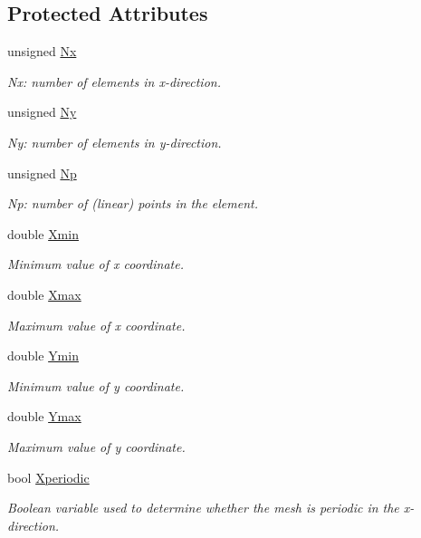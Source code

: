 \subsection*{Protected Attributes}
\begin{DoxyCompactItemize}
\item 
unsigned \hyperlink{classoomph_1_1RectangularQuadMesh_a1b2c0a2d1f8399713033953c72d399ee}{Nx}
\begin{DoxyCompactList}\small\item\em Nx\+: number of elements in x-\/direction. \end{DoxyCompactList}\item 
unsigned \hyperlink{classoomph_1_1RectangularQuadMesh_a49a5ee7ef86ce837fb807eb6014a296d}{Ny}
\begin{DoxyCompactList}\small\item\em Ny\+: number of elements in y-\/direction. \end{DoxyCompactList}\item 
unsigned \hyperlink{classoomph_1_1RectangularQuadMesh_a92502c7536a6644ebffd806841cd4d98}{Np}
\begin{DoxyCompactList}\small\item\em Np\+: number of (linear) points in the element. \end{DoxyCompactList}\item 
double \hyperlink{classoomph_1_1RectangularQuadMesh_af3aab508d077460545031e758396514a}{Xmin}
\begin{DoxyCompactList}\small\item\em Minimum value of x coordinate. \end{DoxyCompactList}\item 
double \hyperlink{classoomph_1_1RectangularQuadMesh_ab8e4ddba0ce8315cf480cdd1f3447684}{Xmax}
\begin{DoxyCompactList}\small\item\em Maximum value of x coordinate. \end{DoxyCompactList}\item 
double \hyperlink{classoomph_1_1RectangularQuadMesh_ade53fec7446044418ccba9f55d692adb}{Ymin}
\begin{DoxyCompactList}\small\item\em Minimum value of y coordinate. \end{DoxyCompactList}\item 
double \hyperlink{classoomph_1_1RectangularQuadMesh_aacbacc3a0e6ea8508abb3140ba343ffa}{Ymax}
\begin{DoxyCompactList}\small\item\em Maximum value of y coordinate. \end{DoxyCompactList}\item 
bool \hyperlink{classoomph_1_1RectangularQuadMesh_a83dd0ace2eb47449f5e30522f71d9f59}{Xperiodic}
\begin{DoxyCompactList}\small\item\em Boolean variable used to determine whether the mesh is periodic in the x-\/direction. \end{DoxyCompactList}\end{DoxyCompactItemize}


